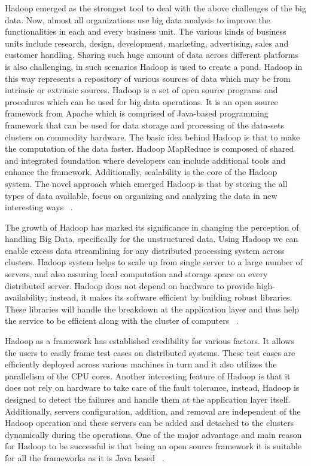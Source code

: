 Hadoop emerged as the strongest tool to deal with the above challenges of the 
big data. Now, almost all organizations use big data analysis to improve the 
functionalities in each and every business unit. The various kinds of business 
units include research, design, development, marketing, advertising, sales and
customer handling. Sharing such huge amount of data across different platforms  
is also challenging,  in such scenarios Hadoop is used to create a pond. Hadoop 
in this way represents a repository of various sources of data which may be from 
intrinsic or extrinsic sources. Hadoop is a set of open source programs and 
procedures which can be used for big data operations. It is an open source 
framework from Apache which is comprised of Java-based programming framework 
that can be used for data storage and processing of the data-sets clusters on 
commodity hardware. The basic idea behind Hadoop is that to make the computation
of the data faster. Hadoop MapReduce is composed of shared and integrated 
foundation where developers can include additional tools and enhance the 
framework. Additionally, scalability is the core of the Hadoop system. The novel
approach which emerged Hadoop is that by storing the all types of data 
available, focus on organizing and analyzing the data in new interesting ways
~\cite{hid-sp18-406-hadoop-intro2}.

The growth of Hadoop has marked its significance in changing the perception of 
handling Big Data, specifically for the unstructured data. Using Hadoop we can 
enable excess data streamlining for any distributed processing system across 
clusters. Hadoop system helps to scale up from single server to a large number 
of servers, and also assuring local computation and storage space on every 
distributed server. Hadoop does not depend on hardware to provide 
high-availability; instead, it makes its software efficient by building robust 
libraries. These libraries will handle the breakdown at the application layer 
and thus help the service to be efficient along with the cluster of computers
~\cite{hid-sp18-406-hadoop-intro3}.

Hadoop as a framework has established credibility for various factors. It allows 
the users to easily frame test cases on distributed systems. These test cases 
are efficiently deployed across various machines in turn and it also utilizes 
the parallelism of the CPU cores. Another interesting feature of Hadoop is that 
it does not rely on hardware to take care of the fault tolerance, instead, 
Hadoop is designed to detect the failures and handle them at the application 
layer itself. Additionally, servers configuration, addition, and removal are 
independent of the Hadoop operation and these servers can be added and detached 
to the clusters dynamically during the operations. One of the major advantage 
and main reason for Hadoop to be successful is that being an open source 
framework it is suitable for all the frameworks as it is Java based
~\cite{hid-sp18-406-hadoop-intro4}.

